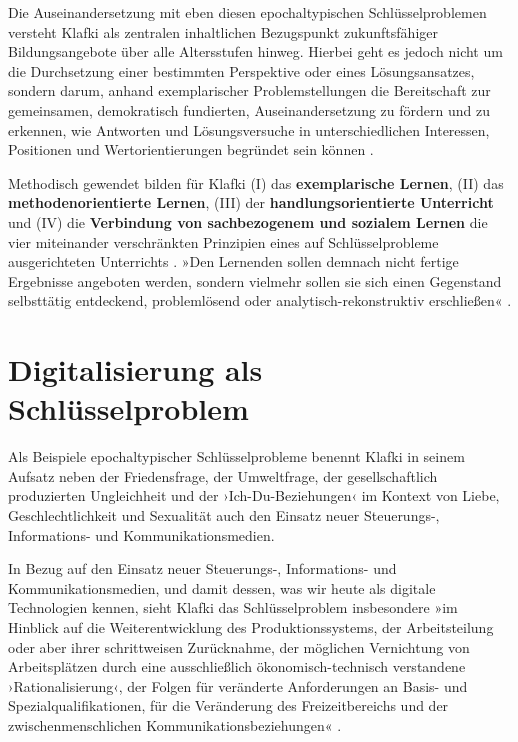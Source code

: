\documentclass[
  a4paper,
]{book}
\begin{document}
Die Auseinandersetzung mit eben diesen epochaltypischen Schlüsselproblemen versteht Klafki als zentralen inhaltlichen Bezugspunkt zukunftsfähiger Bildungsangebote über alle Altersstufen hinweg. Hierbei geht es jedoch nicht um die Durchsetzung einer bestimmten Perspektive oder eines Lösungsansatzes, sondern darum, anhand exemplarischer Problemstellungen die Bereitschaft zur gemeinsamen, demokratisch fundierten, Auseinandersetzung zu fördern und zu erkennen, wie Antworten und Lösungsversuche in unterschiedlichen Interessen, Positionen und Wertorientierungen begründet sein können \citetext{\citealp[S. 61f.]{klafkiNeueStudienZur2007}; \citealp[s. a.][S. 105f.]{kollerGrundbegriffeTheorienUnd2021}}.

Methodisch gewendet bilden für Klafki (I) das \textbf{exemplarische Lernen}, (II) das \textbf{methodenorientierte Lernen}, (III) der \textbf{handlungsorientierte Unterricht} und (IV) die \textbf{Verbindung von sachbezogenem und sozialem Lernen} die vier miteinander verschränkten Prinzipien eines auf Schlüsselprobleme ausgerichteten Unterrichts \citep[S. 61]{klafkiNeueStudienZur2007}. »Den Lernenden sollen demnach nicht fertige Ergebnisse angeboten werden, sondern vielmehr sollen sie sich einen Gegenstand selbsttätig entdeckend, problemlösend oder analytisch-rekonstruktiv erschließen« \citep[S. 109]{rabe-maticevicMedienbildungHochschuleHandlungsorientierte2020}.

\section{Digitalisierung als Schlüsselproblem}\label{digitalisierung-als-schluxfcsselproblem}

Als Beispiele epochaltypischer Schlüsselprobleme benennt Klafki in seinem Aufsatz neben der Friedensfrage, der Umweltfrage, der gesellschaftlich produzierten Ungleichheit und der ›Ich-Du-Beziehungen‹ im Kontext von Liebe, Geschlechtlichkeit und Sexualität auch den Einsatz neuer Steuerungs-, Informations- und Kommunikationsmedien.

In Bezug auf den Einsatz neuer Steuerungs-, Informations- und Kommunikationsmedien, und damit dessen, was wir heute als digitale Technologien kennen, sieht Klafki das Schlüsselproblem insbesondere »im Hinblick auf die Weiterentwicklung des Produktionssystems, der Arbeitsteilung oder aber ihrer schrittweisen Zurücknahme, der möglichen Vernichtung von Arbeitsplätzen durch eine ausschließlich ökonomisch-technisch verstandene ›Rationalisierung‹, der Folgen für veränderte Anforderungen an Basis- und Spezialqualifikationen, für die Veränderung des Freizeitbereichs und der zwischenmenschlichen Kommunikationsbeziehungen« \citep[S. 59]{klafkiNeueStudienZur2007}.
\end{document}
